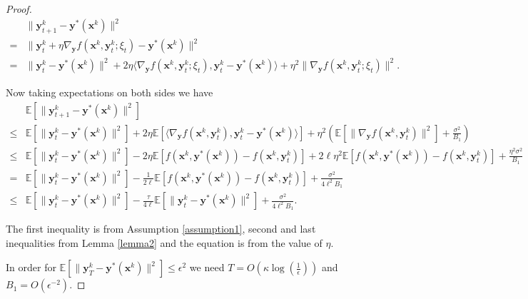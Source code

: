 \begin{proof}
    \begin{align*}
        & \|{ \mathbf{y}}^k_{t+1}-{ \mathbf{y}}^*({ \mathbf{x}}^k)\|^2 \\
        = & \|{ \mathbf{y}}^k_t+\eta \nabla_{ \mathbf{y}} f({ \mathbf{x}}^k,{ \mathbf{y}}^k_t;\xi_t) - { \mathbf{y}}^*({ \mathbf{x}}^k)\|^2 \\
        = & \|{ \mathbf{y}}^k_t-{ \mathbf{y}}^*({ \mathbf{x}}^k)\|^2+2\eta\langle \nabla_{ \mathbf{y}} f({ \mathbf{x}}^k,{ \mathbf{y}}^k_t;\xi_t), { \mathbf{y}}^k_t-{ \mathbf{y}}^*({ \mathbf{x}}^k)\rangle +\eta^2 \|\nabla_{ \mathbf{y}} f({ \mathbf{x}}^k,{ \mathbf{y}}^k_t;\xi_t)\|^2.
    \end{align*}

    Now taking expectations on both sides we have
    \begin{align*}
        & \mathbb{E}[\|{ \mathbf{y}}^k_{t+1}-{ \mathbf{y}}^*({ \mathbf{x}}^k)\|^2] \\
        \leq & \mathbb{E}[\|{ \mathbf{y}}^k_t-{ \mathbf{y}}^*({ \mathbf{x}}^k)\|^2]+2\eta\mathbb{E}[\langle \nabla_{ \mathbf{y}} f({ \mathbf{x}}^k,{ \mathbf{y}}^k_t), { \mathbf{y}}^k_t-{ \mathbf{y}}^*({ \mathbf{x}}^k)\rangle] +\eta^2 (\mathbb{E}[\|\nabla_{ \mathbf{y}} f({ \mathbf{x}}^k,{ \mathbf{y}}^k_t)\|^2]+\frac{\sigma^2}{B_1}) \\
        \leq & \mathbb{E}[\|{ \mathbf{y}}^k_t-{ \mathbf{y}}^*({ \mathbf{x}}^k)\|^2] - 2\eta \mathbb{E}[f({ \mathbf{x}}^k,{ \mathbf{y}}^*({ \mathbf{x}}^k))-f({ \mathbf{x}}^k,{ \mathbf{y}}^k_t)]+2\ell \eta^2\mathbb{E}[f({ \mathbf{x}}^k,{ \mathbf{y}}^*({ \mathbf{x}}^k))-f({ \mathbf{x}}^k,{ \mathbf{y}}^k_t)]+\frac{\eta^2\sigma^2}{B_1} \\
        = & \mathbb{E}[\|{ \mathbf{y}}^k_t-{ \mathbf{y}}^*({ \mathbf{x}}^k)\|^2] - \frac{1}{2\ell} \mathbb{E}[f({ \mathbf{x}}^k,{ \mathbf{y}}^*({ \mathbf{x}}^k))-f({ \mathbf{x}}^k,{ \mathbf{y}}^k_t)]+\frac{\sigma^2}{4\ell^2B_1} \\
        \leq & \mathbb{E}[\|{ \mathbf{y}}^k_t-{ \mathbf{y}}^*({ \mathbf{x}}^k)\|^2] - \frac{\tau}{4\ell}\mathbb{E}[\|{ \mathbf{y}}^k_t-{ \mathbf{y}}^*({ \mathbf{x}}^k)\|^2] +\frac{\sigma^2}{4\ell^2B_1}.
    \end{align*}

    The first inequality is from Assumption \ref{assumption1}, second and last inequalities from Lemma \ref{lemma2} and the equation is from the value of $\eta$.

    In order for $\mathbb{E}[\|{ \mathbf{y}}^k_{T}-{ \mathbf{y}}^*({ \mathbf{x}}^k)\|^2]\leq \epsilon^2$ we need $T=O(\kappa\log(\frac{1}{\epsilon}))$ and $B_1=O(\epsilon^{-2}).$
\end{proof}

